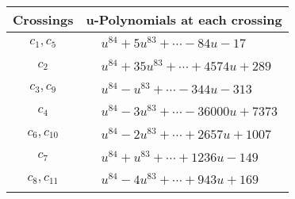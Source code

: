 \documentclass[1p]{elsarticle_modified}
\theoremstyle{definition}
\begin{document}
\begin{tabular}{m{50pt}|m{274pt}}
Crossings & \hspace{64pt}u-Polynomials at each crossing \\
\hline $$\begin{aligned}c_{1},c_{5}\end{aligned}$$&$\begin{aligned}
&u^{84}+5 u^{83}+\cdots-84 u-17
\end{aligned}$\\
\hline $$\begin{aligned}c_{2}\end{aligned}$$&$\begin{aligned}
&u^{84}+35 u^{83}+\cdots+4574 u+289
\end{aligned}$\\
\hline $$\begin{aligned}c_{3},c_{9}\end{aligned}$$&$\begin{aligned}
&u^{84}- u^{83}+\cdots-344 u-313
\end{aligned}$\\
\hline $$\begin{aligned}c_{4}\end{aligned}$$&$\begin{aligned}
&u^{84}-3 u^{83}+\cdots-36000 u+7373
\end{aligned}$\\
\hline $$\begin{aligned}c_{6},c_{10}\end{aligned}$$&$\begin{aligned}
&u^{84}-2 u^{83}+\cdots+2657 u+1007
\end{aligned}$\\
\hline $$\begin{aligned}c_{7}\end{aligned}$$&$\begin{aligned}
&u^{84}+u^{83}+\cdots+1236 u-149
\end{aligned}$\\
\hline $$\begin{aligned}c_{8},c_{11}\end{aligned}$$&$\begin{aligned}
&u^{84}-4 u^{83}+\cdots+943 u+169
\end{aligned}$\\
\hline
\end{tabular}\\~\\
\newpage\renewcommand{\arraystretch}{1}
\end{document}
